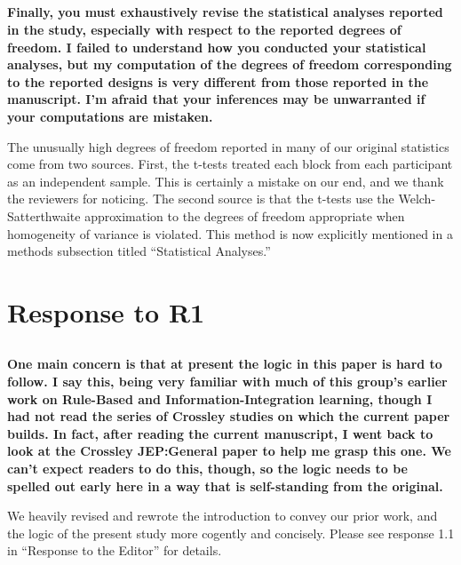 \documentclass[10pt,a4paper]{article} \usepackage{amsmath} \usepackage{parskip}
\begin{document}
\subsection{} \textbf{Finally, you must exhaustively revise the statistical
analyses reported in the study, especially with respect to the reported degrees
of freedom. I failed to understand how you conducted your statistical analyses,
but my computation of the degrees of freedom corresponding to the reported
designs is very different from those reported in the manuscript. I'm afraid that
your inferences may be unwarranted if your computations are mistaken.}

The unusually high degrees of freedom reported in many of our original
statistics come from two sources. First, the t-tests treated each block from
each participant as an independent sample. This is certainly a mistake on our
end, and we thank the reviewers for noticing. The second source is that the
t-tests use the Welch-Satterthwaite approximation to the degrees of freedom
appropriate when homogeneity of variance is violated. This method is now
explicitly mentioned in a methods subsection titled ``Statistical Analyses.''

\section{Response to R1}
\subsection{} \textbf{
  One main concern is that at present the logic in this paper is hard to follow.
  I say this, being very familiar with much of this group's earlier work on
  Rule-Based and Information-Integration learning, though I had not read the
  series of Crossley studies on which the current paper builds. In fact, after
  reading the current manuscript, I went back to look at the Crossley JEP:General
  paper to help me grasp this one. We can't expect readers to do this, though, so
  the logic needs to be spelled out early here in a way that is self-standing from
  the original.
}

We heavily revised and rewrote the introduction to convey our prior work, and
the logic of the present study more cogently and concisely. Please see response
1.1 in ``Response to the Editor'' for details.
\end{document}
